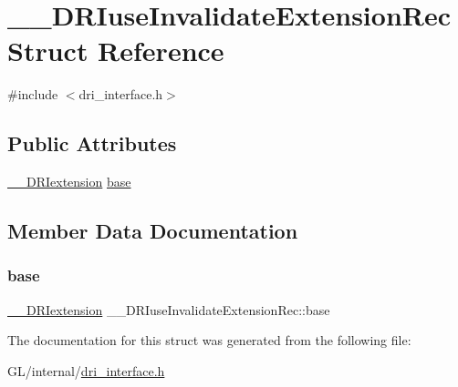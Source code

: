 \hypertarget{struct_____d_r_iuse_invalidate_extension_rec}{}\section{\+\_\+\+\_\+\+D\+R\+Iuse\+Invalidate\+Extension\+Rec Struct Reference}
\label{struct_____d_r_iuse_invalidate_extension_rec}


{\ttfamily \#include $<$dri\+\_\+interface.\+h$>$}

\subsection*{Public Attributes}
\begin{DoxyCompactItemize}
\item 
\hyperlink{dri__interface_8h_a4e0a61c8ece00d2b2c6792a9a1b55385}{\+\_\+\+\_\+\+D\+R\+Iextension} \hyperlink{struct_____d_r_iuse_invalidate_extension_rec_a1d27faf34ceb9d07a7dac9eeff50f209}{base}
\end{DoxyCompactItemize}


\subsection{Member Data Documentation}
\mbox{\label{struct_____d_r_iuse_invalidate_extension_rec_a1d27faf34ceb9d07a7dac9eeff50f209}} 
\subsubsection{\texorpdfstring{base}{base}}
{\footnotesize\ttfamily \hyperlink{dri__interface_8h_a4e0a61c8ece00d2b2c6792a9a1b55385}{\+\_\+\+\_\+\+D\+R\+Iextension} \+\_\+\+\_\+\+D\+R\+Iuse\+Invalidate\+Extension\+Rec\+::base}



The documentation for this struct was generated from the following file\+:\begin{DoxyCompactItemize}
\item 
G\+L/internal/\hyperlink{dri__interface_8h}{dri\+\_\+interface.\+h}\end{DoxyCompactItemize}
